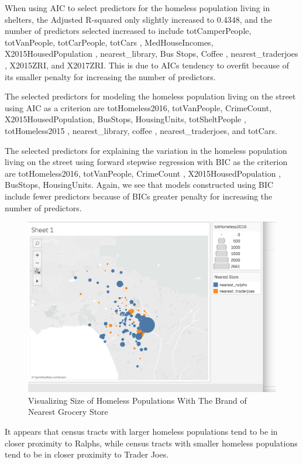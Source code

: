 \documentclass[11pt,letterpaper]{article}
\begin{document}
When using AIC to select predictors for the homeless population living in shelters, the Adjusted R-squared only slightly increased to  0.4348, and the number of predictors selected increased to include totCamperPeople, totVanPeople,  totCarPeople,  totCars , MedHouseIncomes,  X2015HousedPopulation , nearest\_library,  Bus Stops,  Coffee , nearest\_traderjoes , X2015ZRI, and X2017ZRI. This is due to AICs tendency to overfit because of its smaller penalty for increasing the number of predictors.

The selected predictors for modeling the homeless population living on the street using AIC as a criterion are totHomeless2016, totVanPeople, CrimeCount, X2015HousedPopulation, BusStops, HousingUnits,  totSheltPeople , totHomeless2015 , nearest\_library,  coffee , nearest\_traderjoes, and totCars.
 
The selected predictors for explaining the variation in the homeless population living on the street using forward stepwise regression with BIC as the criterion are totHomeless2016, totVanPeople,  CrimeCount , X2015HousedPopulation , BusStops, HousingUnits. Again, we see that models constructed using BIC include fewer predictors because of BICs greater penalty for increasing the number of predictors. 

\begin{figure}[H]
\centering
\caption{Visualizing Size of Homeless Populations With The Brand of Nearest Grocery Store}
\includegraphics[scale=.5]{plot_homless_with_nearestStore.png}
\end{figure}

It appears that census tracts with larger homeless populations tend to be in closer proximity to Ralphs, while census tracts with smaller homeless populations tend to be in closer proximity to Trader Joes.
\end{document}
